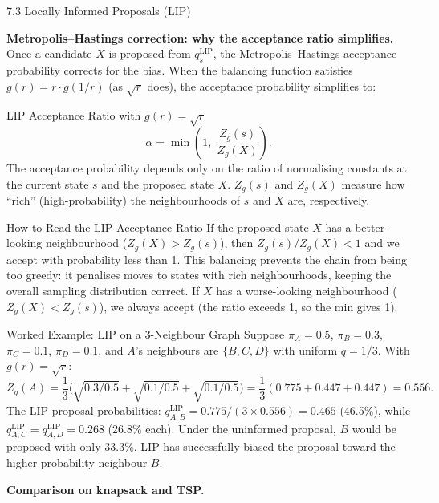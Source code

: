 \documentclass[aspectratio=169,10pt]{beamer}
\begin{document}
\begin{frame}[allowframebreaks]{7.3 Locally Informed Proposals (LIP)}
\framebreak

\textbf{Metropolis--Hastings correction: why the acceptance ratio simplifies.}
Once a candidate $X$ is proposed from $q^{\mathrm{LIP}}_s$, the
Metropolis--Hastings acceptance probability corrects for the bias.  When the
balancing function satisfies $g(r) = r \cdot g(1/r)$ (as $\sqrt{r}$ does),
the acceptance probability simplifies to:

\begin{block}{LIP Acceptance Ratio with $g(r)=\sqrt{r}$}
  \[
    \alpha = \min\!\left(1,\; \frac{Z_g(s)}{Z_g(X)}\right).
  \]
  The acceptance probability depends only on the ratio of normalising
  constants at the current state $s$ and the proposed state $X$.
  $Z_g(s)$ and $Z_g(X)$ measure how ``rich'' (high-probability) the
  neighbourhoods of $s$ and $X$ are, respectively.
\end{block}

\begin{alertblock}{How to Read the LIP Acceptance Ratio}
  If the proposed state $X$ has a better-looking neighbourhood
  ($Z_g(X) > Z_g(s)$), then $Z_g(s)/Z_g(X) < 1$ and we accept with
  probability less than 1.  This balancing prevents the chain from being
  too greedy: it penalises moves to states with rich neighbourhoods, keeping
  the overall sampling distribution correct.  If $X$ has a worse-looking
  neighbourhood ($Z_g(X) < Z_g(s)$), we always accept (the ratio exceeds
  1, so the min gives 1).
\end{alertblock}

\begin{exampleblock}{Worked Example: LIP on a 3-Neighbour Graph}
  Suppose $\pi_A = 0.5$, $\pi_B = 0.3$, $\pi_C = 0.1$, $\pi_D = 0.1$,
  and $A$'s neighbours are $\{B, C, D\}$ with uniform $q = 1/3$.
  With $g(r) = \sqrt{r}$:
  \[
    Z_g(A) = \frac{1}{3}\bigl(\sqrt{0.3/0.5} + \sqrt{0.1/0.5} + \sqrt{0.1/0.5}\bigr)
    = \frac{1}{3}(0.775 + 0.447 + 0.447) = 0.556.
  \]
  The LIP proposal probabilities: $q^{\mathrm{LIP}}_{A,B} = 0.775/(3\times 0.556)
  = 0.465$ (46.5\%), while $q^{\mathrm{LIP}}_{A,C} = q^{\mathrm{LIP}}_{A,D}
  = 0.268$ (26.8\% each).  Under the uninformed proposal, $B$ would be
  proposed with only 33.3\%.  LIP has successfully biased the proposal
  toward the higher-probability neighbour $B$.
\end{exampleblock}

\framebreak

\textbf{Comparison on knapsack and TSP.}


\end{frame}
\end{document}
